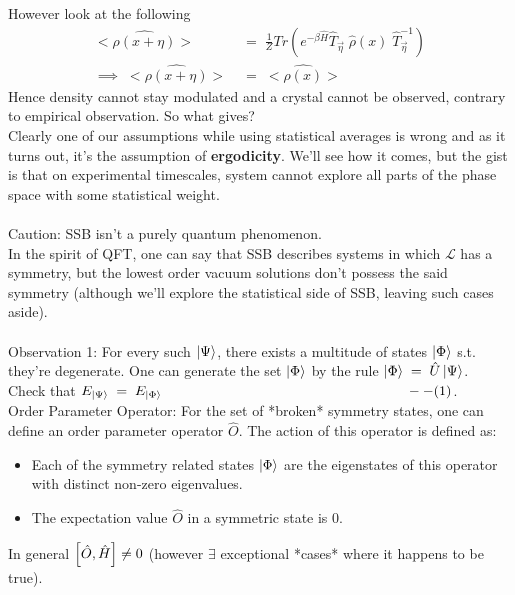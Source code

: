 \documentclass[12pt]{article}
\begin{document}
However look at the following
\begin{align*}
    <\hat{\rho(x+\eta)}> &= \;\frac{1}{Z}Tr(e^{-\beta \hat{H}}\hat{T}_{\Vec{\eta}}\;\hat{\rho}(x)\;\hat{T}^{-1}_{\Vec{\eta}} ) \\
    \implies\; <\hat{\rho(x+\eta)}>\;&=\; <\hat{\rho(x)}>
\end{align*}
Hence density cannot stay modulated and a crystal cannot be observed, contrary to empirical observation. So what gives?\\
Clearly one of our assumptions while using statistical averages is wrong and as it turns out, it's the assumption of \textbf{ergodicity}. We'll see how it comes, but the gist is that on experimental timescales, system cannot explore all parts of the phase space with some statistical weight.\\
\\
Caution: SSB isn't a purely quantum phenomenon.\\
\newline
In the spirit of QFT, one can say that SSB describes systems in which $\mathcal{L}$ has a symmetry, but the lowest order vacuum solutions don't possess the said symmetry (although we'll explore the statistical side of SSB, leaving such cases aside).\\
\\
Observation 1: For every such $\ket{\Psi}$, there exists a multitude of states $\ket{\Phi}$ s.t. they're degenerate. 
One can generate the set {$\ket{\Phi}$} by the rule $\ket{\Phi}\;=\;\hat{U}\ket{\Psi}$.\\
Check that $E_{\ket{\Psi}}\;=\;E_{\ket{\Phi}}\;\;\;\;\;\;\;\;\;\;\;\;\;\;\;\;\;\;\;\;\;\;\;\;\;\;\;\;\;\;\;\;\;\;\;\;\;\;\;\;\;\;\;\;\;\;\;\;\;\;\;\;\;\;\;\;\;\;\;\;\;\;\;--(1)$.\\ 
\newline
Order Parameter Operator: For the set of *broken* symmetry states, one can define an order parameter operator $\hat{O}$.
The action of this operator is defined as:
\begin{itemize}
    \item 
        Each of the symmetry related states {$\ket{\Phi}$} are the eigenstates of this operator with distinct non-zero eigenvalues.
    \item The expectation value $\hat{O}$ in a symmetric state is 0. 
\end{itemize}
In general $\comm{\hat{O}}{\hat{H}}\neq 0$ (however $\exists$ exceptional *cases* where it happens to be true).\\
\end{document}
